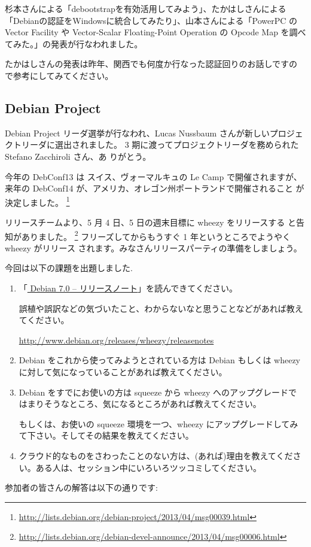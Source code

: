 \documentclass[mingoth,a4paper]{jsarticle}
\begin{document}
杉本さんによる「debootstrapを有効活用してみよう」、たかはしさんによる
「Debianの認証をWindowsに統合してみたり」、山本さんによる「PowerPC の
Vector Facility や Vector-Scalar Floating-Point Operation の Opcode
Map を調べてみた。」の発表が行なわれました。

たかはしさんの発表は昨年、関西でも何度か行なった認証回りのお話しですの
で参考にしてみてください。

\subsection{Debian Project}

Debian Project リーダ選挙が行なわれ、Lucas Nussbaum さんが新しいプロジェ
クトリーダに選出されました。
3 期に渡ってプロジェクトリーダを務められた Stefano Zacchiroli さん、あ
りがとう。

今年の DebConf13 は スイス、ヴォーマルキュの Le Camp で開催されますが、
来年の DebConf14 が、アメリカ、オレゴン州ポートランドで開催されること
が決定しました。
\footnote{\url{http://lists.debian.org/debian-project/2013/04/msg00039.html}}

リリースチームより、5 月 4 日、5 日の週末目標に wheezy をリリースする
と告知がありました。
\footnote{\url{http://lists.debian.org/debian-devel-announce/2013/04/msg00006.html}}
フリーズしてからもうすぐ 1 年というところでようやく wheezy がリリース
されます。みなさんリリースパーティの準備をしましょう。


今回は以下の課題を出題しました.
\begin{screen}
  \begin{enumerate}
  \item %
    「\href{http://www.debian.org/releases/wheezy/releasenotes}{%
      Debian 7.0 -- リリースノート}」を読んできてください。

    誤植や誤訳などの気づいたこと、わからないなと思うことなどがあれば教え
    てください。

    \url{http://www.debian.org/releases/wheezy/releasenotes}
  \item %
    Debian をこれから使ってみようとされている方は Debian もしくは wheezy
    に対して気になっていることがあれば教えてください。
  \item %
    Debian をすでにお使いの方は squeeze から wheezy へのアップグレードで
    はまりそうなところ、気になるところがあれば教えてください。

    もしくは、お使いの squeeze 環境を一つ、wheezy にアップグレードしてみ
    て下さい。そしてその結果を教えてください。
  \item %
    クラウド的なものをさわったことのない方は、(あれば)理由を教えてくださ
    い。ある人は、セッション中にいろいろツッコミしてください。

  \end{enumerate}
\end{screen}
参加者の皆さんの解答は以下の通りです:
\end{document}

